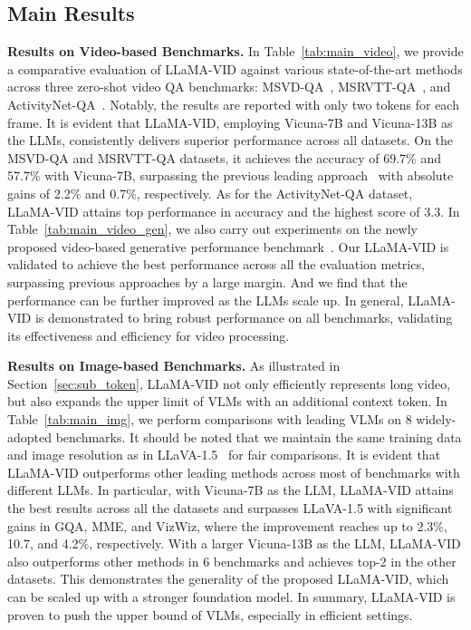 \subsection{Main Results}
\noindent
\textbf{Results on Video-based Benchmarks.}
In Table~\ref{tab:main_video}, we provide a comparative evaluation of LLaMA-VID against various state-of-the-art methods across three zero-shot video QA benchmarks: MSVD-QA~\cite{msvd}, MSRVTT-QA~\cite{msrvtt}, and ActivityNet-QA~\cite{activitynet}.
Notably, the results are reported with only two tokens for each frame.
It is evident that LLaMA-VID, employing Vicuna-7B and Vicuna-13B as the LLMs, consistently delivers superior performance across all datasets. 
On the MSVD-QA and MSRVTT-QA datasets, it achieves the accuracy of 69.7\% and 57.7\% with Vicuna-7B, surpassing the previous leading approach~\cite{btadapter} with absolute gains of 2.2\% and 0.7\%, respectively.
As for the ActivityNet-QA dataset, LLaMA-VID attains top performance in accuracy and the highest score of 3.3.
In Table~\ref{tab:main_video_gen}, we also carry out experiments on the newly proposed video-based generative performance benchmark~\cite{videochatgpt}.
Our LLaMA-VID is validated to achieve the best performance across all the evaluation metrics, surpassing previous approaches by a large margin.
And we find that the performance can be further improved as the LLMs scale up.
In general, LLaMA-VID is demonstrated to bring robust performance on all benchmarks, validating its effectiveness and efficiency for video processing.

\vspace{1.0em}
\noindent
\textbf{Results on Image-based Benchmarks.}
As illustrated in Section~\ref{sec:sub_token}, LLaMA-VID not only efficiently represents long video, but also expands the upper limit of VLMs with an additional context token.
In Table~\ref{tab:main_img}, we perform comparisons with leading VLMs on 8 widely-adopted benchmarks.
It should be noted that we maintain the same training data and image resolution as in LLaVA-1.5~\cite{llava1.5} for fair comparisons.
It is evident that LLaMA-VID outperforms other leading methods across most of benchmarks with different LLMs.
In particular, with Vicuna-7B as the LLM, LLaMA-VID attains the best results across all the datasets and surpasses LLaVA-1.5 with significant gains in GQA, MME, and VizWiz, where the improvement reaches up to 2.3\%, 10.7, and 4.2\%, respectively.
With a larger Vicuna-13B as the LLM, LLaMA-VID also outperforms other methods in 6 benchmarks and achieves top-2 in the other datasets.
This demonstrates the generality of the proposed LLaMA-VID, which can be scaled up with a stronger foundation model.
In summary, LLaMA-VID is proven to push the upper bound of VLMs, especially in efficient settings.

